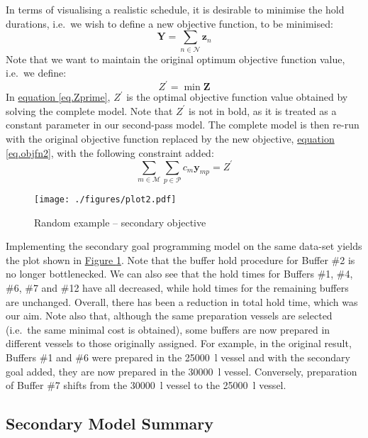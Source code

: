 In terms of visualising a realistic schedule, it is desirable to minimise the
hold durations, i.e.\ we wish to define a new objective function, to be
minimised:
\begin{equation}
    \boldsymbol{Y} = \sum_{n \in \mathcal{N}} \boldsymbol{z}_{n}
    \label{eq.objfn2}
\end{equation}
Note that we want to maintain the original optimum objective function value,
i.e.\ we define:
\begin{equation}
    Z^{\prime} = \min \boldsymbol{Z}
    \label{eq.Zprime}
\end{equation}
In \hyperref[eq.Zprime]{equation \ref*{eq.Zprime}}, $Z^{\prime}$ is the optimal objective function value
obtained by solving the complete model.
Note that $Z^{\prime}$ is not in bold, as it is treated as a constant parameter
in our second-pass model.
The complete model is then re-run with the original objective function replaced
by the new objective, \hyperref[eq.objfn2]{equation \ref*{eq.objfn2}}, with the
following constraint added:
\begin{equation}
    \sum_{m \in \mathcal{M}} \sum_{p \in \mathcal{P}} c_m \boldsymbol{y}_{mp}
    = Z^{\prime}
    \label{eq.constr10}
\end{equation}
\begin{figure}
    \centering
    \texttt{[image: ./figures/plot2.pdf]}
    \caption{Random example -- secondary objective}
    \label{fig.secondary}
\end{figure}

Implementing the secondary goal programming model on the same data-set yields
the plot shown in \hyperref[fig.secondary]{Figure \ref*{fig.secondary}}.
Note that the buffer hold procedure for Buffer \#2 is no longer bottlenecked.
We can also see that the hold times for Buffers \#1, \#4, \#6, \#7 and \#12
have all decreased, while hold times for the remaining buffers are unchanged.
Overall, there has been a reduction in total hold time, which was our aim.
Note also that, although the same preparation vessels are selected (i.e.\ the
same minimal cost is obtained), some buffers are now prepared in different
vessels to those originally assigned.
For example, in the original result, Buffers \#1 and \#6 were prepared in the
\SI{25000}{\litre} vessel and with the secondary goal added, they are now
prepared in the \SI{30000}{\litre} vessel.
Conversely, preparation of Buffer \#7 shifts from the \SI{30000}{\litre} vessel
to the \SI{25000}{\litre} vessel.

\subsection{Secondary Model Summary}\label{SS.model2summary}


